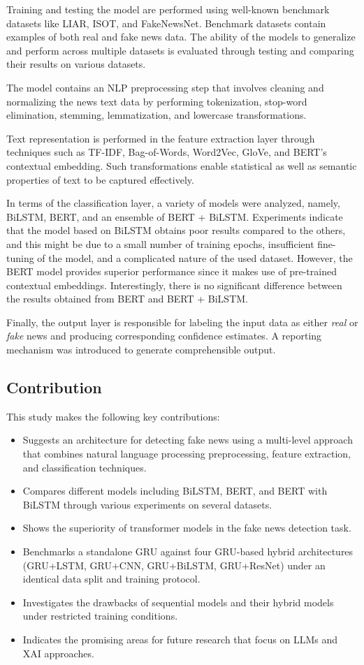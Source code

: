 \documentclass[runningheads]{llncs}
\begin{document}
Training and testing the model are performed using well-known benchmark datasets like LIAR, ISOT, and FakeNewsNet. Benchmark datasets contain examples of both real and fake news data. The ability of the models to generalize and perform across multiple datasets is evaluated through testing and comparing their results on various datasets.

The model contains an NLP preprocessing step that involves cleaning and normalizing the news text data by performing tokenization, stop-word elimination, stemming, lemmatization, and lowercase transformations.

Text representation is performed in the feature extraction layer through techniques such as TF-IDF, Bag-of-Words, Word2Vec, GloVe, and BERT’s contextual embedding. Such transformations enable statistical as well as semantic properties of text to be captured effectively.

In terms of the classification layer, a variety of models were analyzed, namely, BiLSTM, BERT, and an ensemble of BERT + BiLSTM. Experiments indicate that the model based on BiLSTM obtains poor results compared to the others, and this might be due to a small number of training epochs, insufficient fine-tuning of the model, and a complicated nature of the used dataset. However, the BERT model provides superior performance since it makes use of pre-trained contextual embeddings. Interestingly, there is no significant difference between the results obtained from BERT and BERT + BiLSTM.

Finally, the output layer is responsible for labeling the input data as either \textit{real} or \textit{fake} news and producing corresponding confidence estimates. A reporting mechanism was introduced to generate comprehensible output.

\subsection{Contribution}

This study makes the following key contributions:

\begin{itemize}
\item Suggests an architecture for detecting fake news using a multi-level approach that combines natural language processing preprocessing, feature extraction, and classification techniques.
\item Compares different models including BiLSTM, BERT, and BERT with BiLSTM through various experiments on several datasets.
\item Shows the superiority of transformer models in the fake news detection task.
\item Benchmarks a standalone GRU against four GRU-based hybrid architectures (GRU+LSTM, GRU+CNN, GRU+BiLSTM, GRU+ResNet) under an identical data split and training protocol.
\item Investigates the drawbacks of sequential models and their hybrid models under restricted training conditions.
\item Indicates the promising areas for future research that focus on LLMs and XAI approaches.
\end{itemize}
\end{document}
